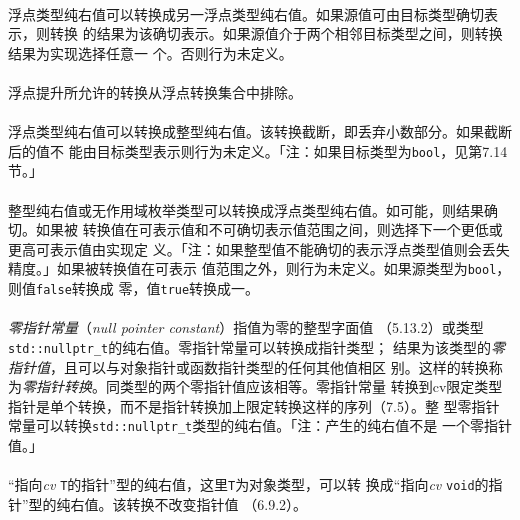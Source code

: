 \paragraph{}
浮点类型纯右值可以转换成另一浮点类型纯右值。如果源值可由目标类型确切表示，则转换
的结果为该确切表示。如果源值介于两个相邻目标类型之间，则转换结果为实现选择任意一
个。否则行为未定义。

\paragraph{}
浮点提升所允许的转换从浮点转换集合中排除。

\paragraph{}
浮点类型纯右值可以转换成整型纯右值。该转换截断，即丢弃小数部分。如果截断后的值不
能由目标类型表示则行为未定义。「注：如果目标类型为\texttt{bool}，见第7.14节。」

\paragraph{}
整型纯右值或无作用域枚举类型可以转换成浮点类型纯右值。如可能，则结果确切。如果被
转换值在可表示值和不可确切表示值范围之间，则选择下一个更低或更高可表示值由实现定
义。「注：如果整型值不能确切的表示浮点类型值则会丢失精度。」如果被转换值在可表示
值范围之外，则行为未定义。如果源类型为\texttt{bool}，则值\texttt{false}转换成
零，值\texttt{true}转换成一。

\paragraph{}
\textit{零指针常量}（\textit{null pointer constant}）指值为零的整型字面值
（5.13.2）或类型\texttt{std::nullptr\_t}的纯右值。零指针常量可以转换成指针类型；
结果为该类型的\textit{零指针值}，且可以与对象指针或函数指针类型的任何其他值相区
别。这样的转换称为\textit{零指针转换}。同类型的两个零指针值应该相等。零指针常量
转换到cv限定类型指针是单个转换，而不是指针转换加上限定转换这样的序列（7.5）。整
型零指针常量可以转换\texttt{std::nullptr\_t}类型的纯右值。「注：产生的纯右值不是
一个零指针值。」

\paragraph{}
``指向\textit{cv} \texttt{T}的指针''型的纯右值，这里\texttt{T}为对象类型，可以转
换成``指向\textit{cv} \texttt{void}的指针''型的纯右值。该转换不改变指针值
（6.9.2）。

